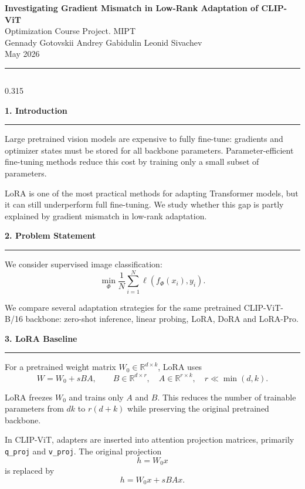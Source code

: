 \documentclass[final]{beamer}
\newcommand{\code}[1]{\texttt{#1}}
\newcommand{\sectiontitle}[1]{%
  \vspace{0.45em}%
  {\Large\bfseries\color{titleblue}#1}\par
  \vspace{0.10em}%
  {\color{rulegray}\rule{\linewidth}{0.9pt}}\par
  \vspace{0.22em}%
}
\begin{document}
\begin{frame}[t]

\begin{center}
  {\VeryHuge\bfseries\color{titleblue}
  Investigating Gradient Mismatch in Low-Rank Adaptation of CLIP-ViT}\\[0.35em]
  {\Large Optimization Course Project. MIPT}\\[0.35em]
  {\Large Gennady Gotovskii \quad Andrey Gabidulin \quad Leonid Sivachev}\\[0.2em]
  {\large May 2026}
\end{center}

\vspace{0.9em}
{\color{rulegray}\rule{\textwidth}{1.2pt}}
\vspace{0.6em}

\begin{columns}[t,totalwidth=\textwidth]

\begin{column}{0.315\textwidth}
\color{textgray}

\sectiontitle{1. Introduction}
\justifying
Large pretrained vision models are expensive to fully fine-tune: gradients and
optimizer states must be stored for all backbone parameters. Parameter-efficient
fine-tuning methods reduce this cost by training only a small subset of
parameters.

LoRA is one of the most practical methods for adapting Transformer models, but
it can still underperform full fine-tuning. We study whether this gap is partly
explained by gradient mismatch in low-rank adaptation.

\sectiontitle{2. Problem Statement}
We consider supervised image classification:
\[
  \min_{\Phi} \frac{1}{N}\sum_{i=1}^{N}
  \ell(f_{\Phi}(x_i), y_i).
\]

We compare several adaptation strategies for the same pretrained
CLIP-ViT-B/16 backbone: zero-shot inference, linear probing, LoRA, DoRA and
LoRA-Pro.

\sectiontitle{3. LoRA Baseline}
For a pretrained weight matrix $W_0 \in \mathbb{R}^{d \times k}$, LoRA uses
\[
  W = W_0 + sBA,\qquad
  B\in\mathbb{R}^{d\times r},\quad
  A\in\mathbb{R}^{r\times k},\quad
  r\ll \min(d,k).
\]

LoRA freezes $W_0$ and trains only $A$ and $B$. This reduces the number of
trainable parameters from $dk$ to $r(d+k)$ while preserving the original
pretrained backbone.

In CLIP-ViT, adapters are inserted into attention projection matrices, primarily
\code{q\_proj} and \code{v\_proj}. The original projection
\[
  h = W_0x
\]
is replaced by
\[
  h = W_0x + sBAx.
\]


\end{column}
\end{columns}
\end{frame}
\end{document}
